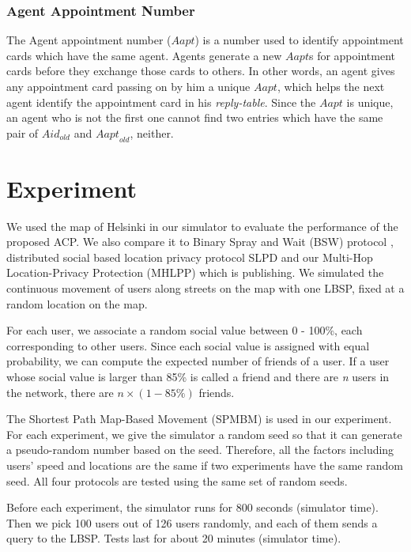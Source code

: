 \documentclass[conference]{IEEEtran}
\begin{document}
\subsubsection{ Agent Appointment Number}

The Agent appointment number ($Aapt$) is a number used to identify appointment cards which have the same agent. Agents generate a new $Aapt$s for appointment cards before they exchange those cards to others. In other words, an agent gives any appointment card passing on by him a unique $Aapt$, which helps the next agent identify the appointment card in his \textit{reply-table}. Since the $Aapt$ is unique, an agent who is not the first one cannot find two entries which have the same pair of ${Aid}_{old}$ and ${Aapt}_{old}$, neither.

\section{ Experiment} \label{Experiment}

We used the map of Helsinki in our simulator to evaluate the performance of the proposed ACP. We also compare it to Binary Spray and Wait (BSW) protocol \cite{C19}, distributed social based location privacy protocol SLPD and our Multi-Hop Location-Privacy Protection (MHLPP) which is publishing. We simulated the continuous movement of users along streets on the map with one LBSP, fixed at a random location on the map.

For each user, we associate a random social value between 0 - 100\%, each corresponding to other users. Since each social value is assigned with equal probability, we can compute the expected number of friends of a user. If a user whose social value is larger than 85\% is called a friend and there are \textit{n} users in the network, there are $n\times \left(1-85\%\right)$ friends.

The Shortest Path Map-Based Movement (SPMBM) \cite{C22} is used in our experiment. For each experiment, we give the simulator a random seed so that it can generate a pseudo-random number based on the seed. Therefore, all the factors including users' speed and locations are the same if two experiments have the same random seed. All four protocols are tested using the same set of random seeds.

Before each experiment, the simulator runs for 800 seconds (simulator time). Then we pick 100 users out of 126 users randomly, and each of them sends a query to the LBSP. Tests last for about 20 minutes (simulator time). 
\end{document}
